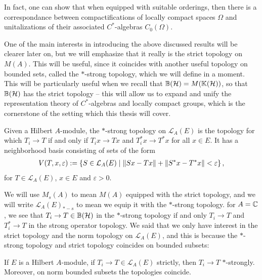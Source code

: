 In fact, one can show that when equipped with suitable orderings, then there is a correspondance between compactifications of locally compact spaces $\Omega$ and unitalizations of their associated $C^*$-algebras $C_0(\Omega)$.


One of the main interests in introducing the above discussed results will be clearer later on, but we will emphasize that it really is the strict topology on $M(A)$. This will be useful, since it coincides with another useful topology on bounded sets, called the $*$-strong topology, which we will define in a moment. This will be particularly useful when we recall that $\mathbb{B}(\mathcal{H})=M(\mathbb{K}(\mathcal{H}))$, so that $\mathbb{B}(\mathcal{H})$ has the strict topology -- this will allow us to expand and unify the representation theory of $C^*$-algebras and locally compact groups, which is the cornerstone of the setting which this thesis will cover.
\begin{definition}
	Given a Hilbert $A$-module, the $*$-strong topology on $\mathcal{L}_A(E)$ is the topology for which $T_i \to T$ if and only if $T_i x \to Tx$ and $T_i^* x \to T^*x$ for all $x \in E$. It has a neighborhood basis consisting of sets of the form
	\begin{align*}
		V(T,x,\varepsilon) := \left\{ S \in \mathcal{L}_A(E) \mid \left\lVert Sx-Tx\right\rVert + \left\lVert S^*x - T^*x\right\rVert < \varepsilon \right\},
	\end{align*}
	for $T \in \mathcal{L}_A(E)$, $x \in E$ and $ \varepsilon > 0$.
\end{definition}
We will use $M_s(A)$ to mean $M(A)$ equipped with the strict topology, and we will write $\mathcal{L}_A(E)_{*-s}$ to mean we equip it with the $*$-strong topology. for $A=\mathbb{C}$, we see that $T_i \to T \in \mathbb{B}(\mathcal{H})$ in the $*$-strong topology if and only $T_i \to T$ and $T_i^* \to T$ in the strong operator topology. We said that we only have interest in the strict topology and the norm topology on $\mathcal{L}_A(E)$, and this is because the $*$-strong topology and strict topology coincides on bounded subsets:
\begin{proposition}
	If $E$ is a Hilbert $A$-module, if $T_i \to T \in \mathcal{L}_A(E)$ strictly, then $T_i \to T$ $*$-strongly. Moreover, on norm bounded subsets the topologies coincide.
	\label{mult:STARTSTRONG}
\end{proposition}
